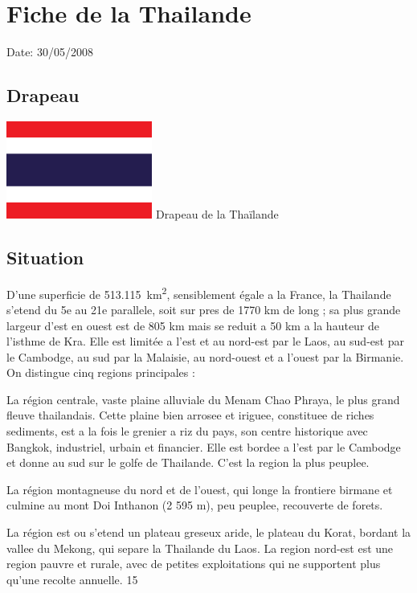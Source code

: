 \section{Fiche de la Thailande}

Date: 30/05/2008

\begin{multicols}{2}

\subsection{Drapeau}

\hspace*{-0.65cm}
\includegraphics[width=4.8cm]{articles/Fiche-de-la-thailande/drapeau_thailande.png}
Drapeau de la Thaïlande

\subsection{Situation}

D’une superficie de \SI{513.115}{km^2}, sensiblement égale a la France, la Thailande s’etend du 5e au 21e parallele, soit sur pres de 1770 km de long ; sa plus grande largeur d’est en ouest est de 805 km mais se reduit a 50 km a la hauteur de l’isthme de Kra.
Elle est limitée a l’est et au nord-est par le Laos, au sud-est par le Cambodge, au sud par la Malaisie, au nord-ouest et a l’ouest par la Birmanie. On distingue cinq regions principales :

La région centrale, vaste plaine alluviale du Menam Chao Phraya, le plus grand fleuve thailandais. Cette plaine bien arrosee et iriguee, constituee de riches sediments, est a la fois le grenier a riz du pays, son centre historique avec Bangkok, industriel, urbain et financier. Elle est bordee a l’est par le Cambodge et donne au sud sur le golfe de Thailande. C’est la region la plus peuplee.

La région montagneuse du nord et de l’ouest, qui longe la frontiere birmane et culmine au mont Doi Inthanon (2 595 m), peu peuplee, recouverte de forets.

La région est ou s’etend un plateau greseux aride, le plateau du Korat, bordant la vallee du Mekong, qui separe la Thailande du Laos. La region nord-est est une region pauvre et rurale, avec de petites exploitations qui ne supportent plus qu’une recolte annuelle. 15%


\end{multicols}
